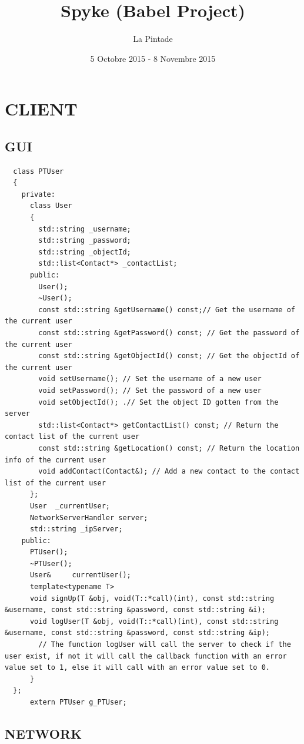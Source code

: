 \documentclass{article}
\title{Spyke (Babel Project)}
\author{La Pintade}
\date{5 Octobre 2015 - 8 Novembre 2015}
\begin{document}
  \maketitle
  \tableofcontents


  \newpage
  \section{CLIENT}
  \subsection{GUI}
    \begin{lstlisting}
  class PTUser
  {
    private:
      class User
      {
        std::string _username;
        std::string _password;
        std::string _objectId;
        std::list<Contact*> _contactList;
      public:
        User();
        ~User();
        const std::string &getUsername() const;// Get the username of the current user
        const std::string &getPassword() const; // Get the password of the current user
        const std::string &getObjectId() const; // Get the objectId of the current user
        void setUsername(); // Set the username of a new user
        void setPassword(); // Set the password of a new user
        void setObjectId(); .// Set the object ID gotten from the server
        std::list<Contact*> getContactList() const; // Return the contact list of the current user
        const std::string &getLocation() const; // Return the location info of the current user
        void addContact(Contact&); // Add a new contact to the contact list of the current user
      };
      User	_currentUser;
      NetworkServerHandler server;
      std::string _ipServer;
    public:
      PTUser();
      ~PTUser();
      User&		currentUser();
      template<typename T>
      void signUp(T &obj, void(T::*call)(int), const std::string &username, const std::string &password, const std::string &i);
      void logUser(T &obj, void(T::*call)(int), const std::string &username, const std::string &password, const std::string &ip);
        // The function logUser will call the server to check if the user exist, if not it will call the callback function with an error value set to 1, else it will call with an error value set to 0.
      }
  };
      extern PTUser g_PTUser;
\end{lstlisting}

\newpage

\subsection{NETWORK}
\end{document}

